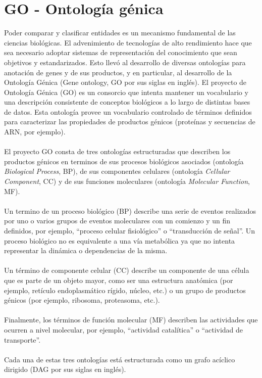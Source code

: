 \section{GO - Ontología génica}
\label{sec:go}
Poder comparar y clasificar entidades es un mecanismo fundamental de las ciencias biológicas. El advenimiento de tecnologías de alto rendimiento hace que sea necesario adoptar sistemas de representación del conocimiento que sean objetivos y estandarizados. Esto llevó al desarrollo de diversas ontologías para anotación de genes y de sus productos, y en particular, al desarrollo de la Ontología Génica (Gene ontology, GO por sus siglas en inglés).
El proyecto de Ontología Génica (GO) es un consorcio que intenta mantener un vocabulario y una descripción consistente de conceptos biológicos a lo largo de distintas bases de datos. Esta ontología provee un vocabulario controlado de términos definidos para caracterizar las propiedades de productos génicos (proteínas y secuencias de ARN, por ejemplo).\\\\
El proyecto GO consta de tres ontologías estructuradas que describen los productos génicos en terminos de sus procesos biológicos asociados (ontología \textit{Biological Process}, BP), de sus componentes celulares (ontología \textit{Cellular Component}, CC) y de sus funciones moleculares (ontología \textit{Molecular Function}, MF).\\\\
Un termino de un proceso biológico (BP) describe una serie de eventos realizados por uno o varios grupos de eventos moleculares con un comienzo y un fin definidos, por ejemplo, ``proceso celular fisiológico'' o ``transducción de señal''. Un proceso biológico no es equivalente a una vía metabólica ya que no intenta representar la dinámica o dependencias de la misma.\\\\
Un término de componente celular (CC) describe un componente de una célula que es parte de un objeto mayor, como ser una estructura anatómica (por ejemplo, retículo endoplasmático rígido, núcleo, etc.) o un grupo de productos génicos (por ejemplo, ribosoma, proteasoma, etc.).\\\\
Finalmente, los términos de función molecular (MF) describen las actividades que ocurren a nivel molecular, por ejemplo, ``actividad catalítica'' o ``actividad de transporte''.\\\\
Cada una de estas tres ontologías está estructurada como un grafo acíclico dirigido (DAG por sus siglas en inglés).\\\\

